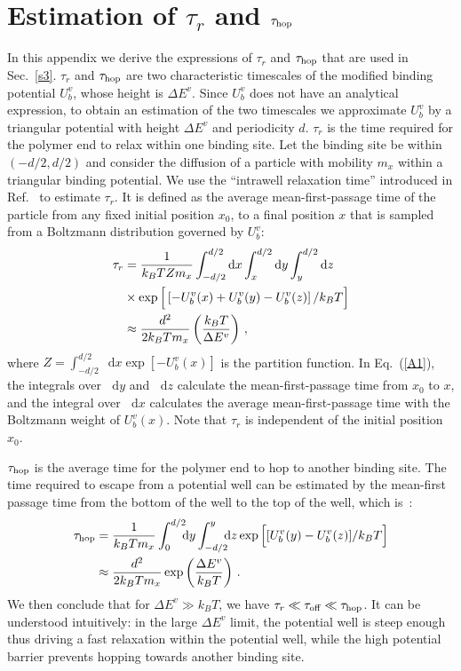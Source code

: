 \documentclass[twocolumn,prl,english]{revtex4-1}
\newcommand*\diff{\mathop{}\!\mathrm{d}}
\begin{document}
\appendix
\section{Estimation of $\tau_r$ and $\tau_{\rm hop}$}
\renewcommand{\theequation}{A\arabic{equation}}
\setcounter{equation}{0}
\renewcommand{\thefigure}{A\arabic{figure}}
\setcounter{figure}{0}
In this appendix we derive the expressions of $\tau_r$ and $\tau_{\rm hop}$ that are used in Sec.~\ref{s3}. $\tau_r$ and $\tau_{\rm hop}$ are two characteristic timescales of the modified binding potential $U_b^v$, whose height is $\Delta E^v$.  Since $U_b^v$ does not have an analytical expression, to obtain an estimation of the two timescales we approximate $U_b^v$ by a triangular potential with height $\Delta E^v$ and periodicity $d$. 
$\tau_r$ is the time required for the polymer end to relax within one binding site.  Let the binding site be within $(-d/2,d/2)$ and consider the diffusion of a particle with mobility $m_x$ within a triangular binding potential. We use the ``intrawell relaxation time'' introduced in Ref.~\cite{Derenyi1999} to estimate $\tau_r$. It is defined as the average mean-first-passage time of the particle from any fixed initial position $x_0$, to a final position $x$ that is sampled from a Boltzmann distribution governed by $U_b^v$:
\begin{align}
\tau_r &= \frac{1}{k_B T Zm_x}\int_{-d/2}^{d/2}\diff x\int_{x}^{d/2}\diff y\int_{y}^{d/2}\diff z\notag\\&\times\exp\Big[\left[-U_b^v(x)+U_b^v(y)-U_b^v(z)\right]/k_B T\Big]\notag\\&\approx \frac{ d^2}{2k_B Tm_x}\left(\frac{k_B T}{\Delta E^v}\right)\,,\label{A1}
\end{align}
where $Z = \int_{-d/2}^{d/2}\diff x \exp[-U_b^v(x)]$ is the partition function. In Eq.~(\ref{A1}), the integrals over $\diff y$ and $\diff z$ calculate the mean-first-passage time from $x_0$ to $x$, and the integral over $\diff x$ calculates the average mean-first-passage time with the Boltzmann weight of $U_b^v(x)$. Note that $\tau_r $ is independent of the initial position $x_0$.



$\tau_{\rm hop}$ is the average time for the polymer end to hop to another binding site. The time required to escape from a potential well can be estimated by the mean-first passage time from the bottom of the well to the top of the well, which is~\cite{Gardiner}:
\begin{align}
\tau_{\rm hop}&=\frac{1}{k_B Tm_x} \int_0^{d/2}\!\!\!\diff y\int_{-d/2}^y\!\!\!\diff z	\exp\Big[[U_b^v(y)-U_b^v(z)]/k_B T\Big]\notag\\&\approx \frac{d^2}{2k_B Tm_x}\exp\left(\frac{\Delta E^v}{k_B T}\right)\,.\label{A2}
\end{align}
We then conclude that for  $\Delta E^v\gg k_B T$, we have $\tau_r\ll\tau_{\rm off}\ll\tau_{\rm hop}$. It can be understood intuitively: in the large $\Delta E^v$ limit, the potential well is steep enough thus driving a fast relaxation within the potential well, while the high potential barrier prevents hopping towards another binding site. 

 

\end{document}
